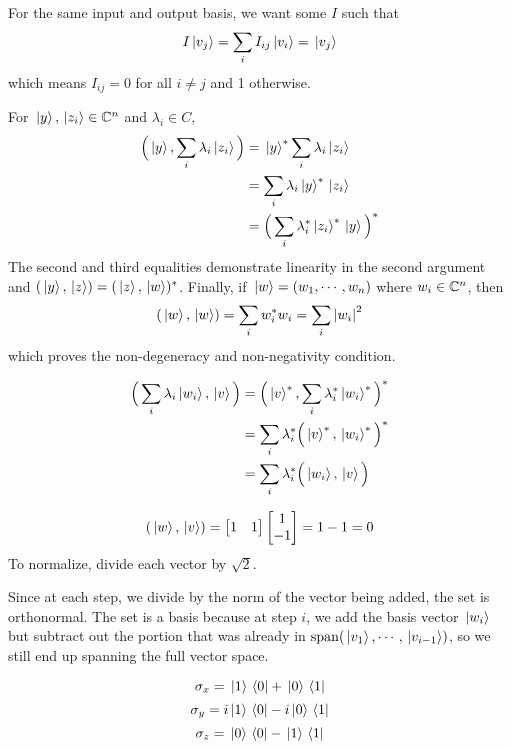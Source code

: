 \exercise 
For the same input and output basis, we want some $I$ such that 
$$I\ket*{v_{j}} = \sum_{i} I_{ij} \ket*{v_{i}} = \ket*{v_{j}}$$
which means $I_{ij} = 0$ for all $i \neq j$ and 1 otherwise. 

\exercise
For $\ket*{y}, \ket*{z_{i}} \in \mathbb{C}^{n}$ and $\lambda_{i} \in C$, 
$$
\begin{aligned}
\Big( \ket*{y}, \sum_{i} \lambda_{i} \ket*{z_{i}} \Big) &= \ket*{y}^{*} \sum_{i} \lambda_{i} \ket*{z_{i}} \\
&= \sum_{i} \lambda_{i} \ket*{y}^{*} \ket*{z_{i}} \\
&= \Big( \sum_{i} \lambda_{i}^{*} \ket*{z_{i}}^{*} \ket*{y} \Big)^{*}
\end{aligned}
$$
The second and third equalities demonstrate linearity in the second argument and $(\ket*{y}, \ket*{z}) = (\ket*{z}, \ket*{w})^{*}$. Finally, if $\ket*{w} = (w_{1}, \cdots, w_{n})$ where $w_{i} \in \mathbb{C}^{n}$, then
$$(\ket*{w}, \ket*{w}) = \sum_{i} w_{i}^{*} w_{i} = \sum_{i} \abs{w_{i}}^{2}$$
which proves the non-degeneracy and non-negativity condition. 

\exercise
$$
\begin{aligned}
\Big( \sum_{i} \lambda_{i} \ket*{w_{i}}, \ket*{v} \Big) &= \Big( \ket*{v}^{*}, \sum_{i} \lambda_{i}^{*} \ket*{w_{i}}^{*} \Big)^{*} \\
&= \sum_{i} \lambda_{i}^{*} \Big( \ket*{v}^{*}, \ket*{w_{i}}^{*} \Big)^{*} \\
&= \sum_{i} \lambda_{i}^{*} \Big( \ket*{w_{i}}, \ket*{v} \Big)
\end{aligned}
$$

\exercise
$$(\ket*{w}, \ket*{v}) = \begin{bmatrix}
1 & 1
\end{bmatrix} \begin{bmatrix}
1 \\
-1
\end{bmatrix} = 1 - 1 = 0$$
To normalize, divide each vector by $\sqrt{2}$. 

\exercise
Since at each step, we divide by the norm of the vector being added, the set is orthonormal. The set is a basis because at step $i$, we add the basis vector $\ket*{w_{i}}$ but subtract out the portion that was already in $\operatorname{span}( \ket*{v_{1}}, \cdots, \ket*{v_{i-1}})$, so we still end up spanning the full vector space. 

\exercise
$$\sigma_{x} = \ket*{1} \bra*{0} + \ket*{0} \bra*{1} $$
$$\sigma_{y} = i \ket*{1} \bra*{0} - i \ket*{0} \bra*{1}$$
$$\sigma_{z} = \ket*{0} \bra*{0} - \ket*{1} \bra*{1}$$

